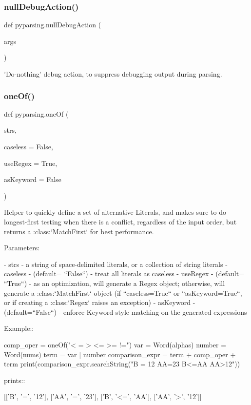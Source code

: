 \subsubsection{\texorpdfstring{null\+Debug\+Action()}{nullDebugAction()}}
{\footnotesize\ttfamily def pyparsing.\+null\+Debug\+Action (\begin{DoxyParamCaption}\item[{}]{args }\end{DoxyParamCaption})}

\begin{DoxyVerb}'Do-nothing' debug action, to suppress debugging output during parsing.\end{DoxyVerb}
 \mbox{\label{namespacepyparsing_a98720c0a7307da8e72d225755faeea30}} 
\subsubsection{\texorpdfstring{one\+Of()}{oneOf()}}
{\footnotesize\ttfamily def pyparsing.\+one\+Of (\begin{DoxyParamCaption}\item[{}]{strs,  }\item[{}]{caseless = {\ttfamily False},  }\item[{}]{use\+Regex = {\ttfamily True},  }\item[{}]{as\+Keyword = {\ttfamily False} }\end{DoxyParamCaption})}

\begin{DoxyVerb}Helper to quickly define a set of alternative Literals, and makes
sure to do longest-first testing when there is a conflict,
regardless of the input order, but returns
a :class:`MatchFirst` for best performance.

Parameters:

 - strs - a string of space-delimited literals, or a collection of
   string literals
 - caseless - (default= ``False``) - treat all literals as
   caseless
 - useRegex - (default= ``True``) - as an optimization, will
   generate a Regex object; otherwise, will generate
   a :class:`MatchFirst` object (if ``caseless=True`` or ``asKeyword=True``, or if
   creating a :class:`Regex` raises an exception)
 - asKeyword - (default=``False``) - enforce Keyword-style matching on the
   generated expressions

Example::

    comp_oper = oneOf("< = > <= >= !=")
    var = Word(alphas)
    number = Word(nums)
    term = var | number
    comparison_expr = term + comp_oper + term
    print(comparison_expr.searchString("B = 12  AA=23 B<=AA AA>12"))

prints::

    [['B', '=', '12'], ['AA', '=', '23'], ['B', '<=', 'AA'], ['AA', '>', '12']]
\end{DoxyVerb}
 \mbox{\label{namespacepyparsing_ae35d76fb7539167de55fee44a601aabf}} 
